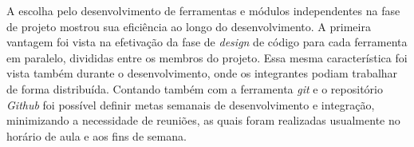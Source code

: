 A escolha pelo desenvolvimento de ferramentas e módulos independentes na fase de projeto mostrou sua eficiência ao longo do desenvolvimento. 
A primeira vantagem foi vista na efetivação da fase de \emph{design} de código para cada ferramenta em paralelo, divididas entre os membros do projeto.
Essa mesma característica foi vista também durante o desenvolvimento, onde os integrantes podiam trabalhar de forma distribuída.
Contando também com a ferramenta \emph{git} e o repositório \emph{Github} foi possível definir metas semanais de desenvolvimento e integração, minimizando a necessidade de reuniões, as quais foram realizadas usualmente no horário de aula e aos fins de semana.
